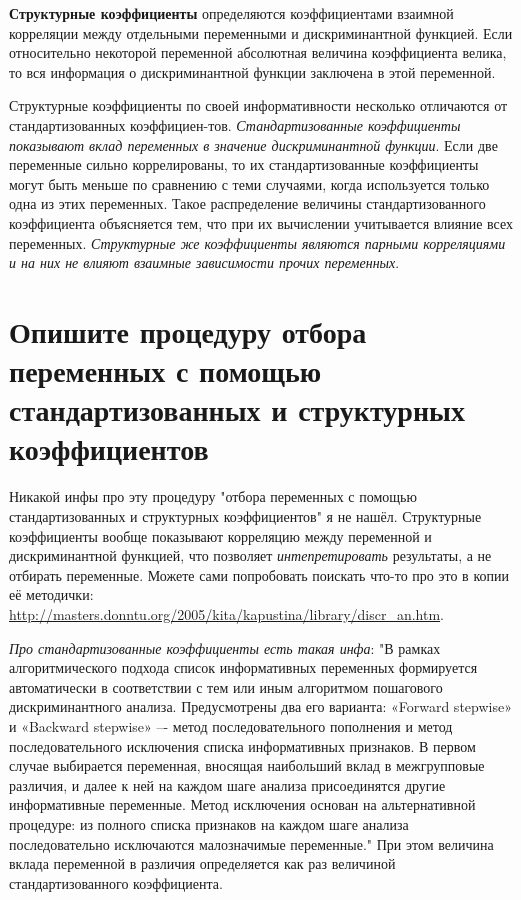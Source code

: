 \documentclass[a4paper, 12pt]{article}
\begin{document}
\textbf{Структурные коэффициенты}  определяются коэффициентами взаимной корреляции между отдельными переменными и дискриминантной функцией. Если относительно некоторой переменной абсолютная величина коэффициента велика, то вся информация о дискриминантной функции заключена в этой переменной. 

Структурные коэффициенты по своей информативности несколько отличаются от стандартизованных коэффициен-тов. \textit{Стандартизованные коэффициенты показывают вклад переменных в значение дискриминантной функции}. Если две переменные сильно коррелированы, то их стандартизованные коэффициенты могут быть меньше по сравнению с теми случаями, когда используется только одна из этих переменных. Такое распределение величины стандартизованного коэффициента объясняется тем, что при их вычислении учитывается влияние всех переменных. \textit{Структурные же коэффициенты являются парными корреляциями и на них не влияют взаимные зависимости прочих переменных}.

\section{Опишите процедуру отбора переменных с помощью стандартизованных и структурных коэффициентов}
Никакой инфы про эту процедуру "отбора переменных с помощью стандартизованных и структурных коэффициентов" я не нашёл. Структурные коэффициенты вообще показывают корреляцию между переменной и дискриминантной функцией, что позволяет {\it интепретировать} результаты, а не отбирать переменные. Можете сами попробовать поискать что-то про это в копии её методички: \url{http://masters.donntu.org/2005/kita/kapustina/library/discr_an.htm}.

{\it Про стандартизованные коэффициенты есть такая инфа}: "В рамках алгоритмического подхода список информативных
переменных формируется автоматически в соответствии с тем
или иным алгоритмом пошагового дискриминантного анализа.
Предусмотрены два его варианта: «Forward stepwise» и
«Backward stepwise» –- метод последовательного пополнения и
метод последовательного исключения списка информативных
признаков. В первом случае выбирается переменная, вносящая
наибольший вклад в межгрупповые различия, и далее к ней на
каждом шаге анализа присоединятся другие информативные переменные. Метод исключения основан на альтернативной процедуре: из полного списка признаков на каждом шаге анализа последовательно исключаются малозначимые переменные." При этом величина вклада переменной в различия определяется как раз величиной стандартизованного коэффициента.
\end{document}
